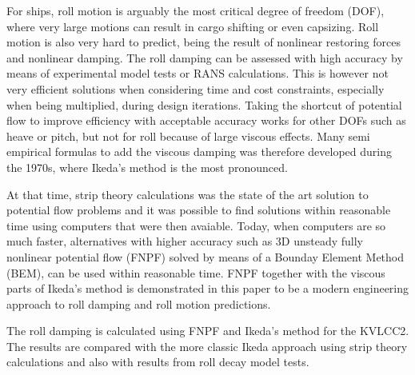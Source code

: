 For ships, roll motion is arguably the most critical degree of freedom (DOF), where very large motions can result in cargo shifting or even capsizing. Roll motion is also very hard to predict, being the result of nonlinear restoring forces and nonlinear damping. The roll damping can be assessed with high accuracy by means of experimental model tests or RANS calculations. This is however not very efficient solutions when considering time and cost constraints, especially when being multiplied, during design iterations. Taking the shortcut of potential flow to improve efficiency with acceptable accuracy works for other DOFs such as heave or pitch, but not for roll because of large viscous effects. Many semi empirical formulas to add the viscous damping was therefore developed during the 1970s, where Ikeda's method is the most pronounced.  

At that time, strip theory calculations was the state of the art solution to potential flow problems and it was possible to find solutions within reasonable time using computers that were then avaiable. Today, when computers are so much faster, alternatives with higher accuracy such as 3D unsteady fully nonlinear potential flow (FNPF) solved by means of a Bounday Element Method (BEM), can be used within reasonable time. FNPF together with the viscous parts of Ikeda's method is demonstrated in this paper to be a modern engineering approach to roll damping and roll motion predictions.

The roll damping is calculated using FNPF and Ikeda's method for the KVLCC2. The results are compared with the more classic Ikeda approach using strip theory calculations and also with results from roll decay model tests.   



